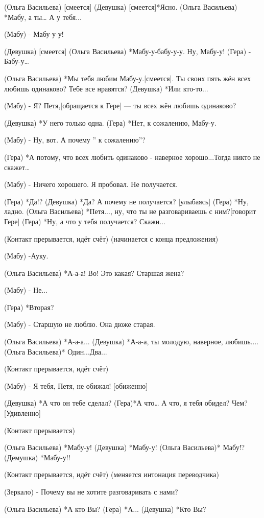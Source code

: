 (Ольга Васильева) [смеется] 
(Девушка) [смеется]*Ясно.
(Ольга Васильева) *Мабу, а ты… А у тебя...

(Мабу) -  Мабу-у-у!

(Девушка) [смеется] 
(Ольга Васильева) *Мабу-у-бабу-у-у. Ну, Мабу-у!
(Гера) - Бабу-у…

(Ольга Васильева) *Мы тебя любим Мабу-у.[смеется]. Ты своих пять жён всех любишь одинаково? Тебе все нравятся? 
(Девушка) *Или кто-то...

(Мабу) - Я? Петя,[обращается к Гере] — ты всех жён любишь одинаково?

(Девушка) *У него только одна.
(Гера) *Нет, к сожалению, Мабу-у. 

(Мабу)  - Ну, вот. А почему ” к сожалению”?

(Гера) *А потому, что всех любить одинаково - наверное хорошо...Тогда никто не скажет…

(Мабу) - Ничего хорошего. Я пробовал.  Не получается.

(Гера) *Да!?
(Девушка) *Да? А почему не получается? [улыбаясь]
(Гера) *Ну, ладно.
(Ольга Васильева) *Петя..., ну, что ты не разговариваешь с ним?[говорит Гере]
(Гера) *Ну, а что у тебя получается? Скажи...

(Контакт прерывается, идёт счёт)
(начинается с конца предложения)

(Мабу) -Ауку.

(Ольга Васильева) *А-а-а! Во! Это какая? Старшая жена?

(Мабу) - Не...

(Гера) *Вторая?

 (Мабу) - Старшую не люблю. Она  дюже старая.

(Ольга Васильева) *А-а-а...
(Девушка) *А-а-а, ты молодую, наверное, любишь....
(Ольга Васильева)* Один...Два...

(Контакт прерывается, идёт счёт)


 (Мабу) - Я тебя, Петя, не обижал! [обиженно]

(Девушка) *А что он тебе сделал?
(Гера)*А что… А что, я тебя обидел? Чем? [Удивленно]

(Контакт прерывается)

(Ольга Васильева) *Мабу-у!
(Девушка) *Мабу-у!
(Ольга Васильева)* Мабу!?
(Демушка) *Мабу-у!!

(Контакт прерывается, идёт счёт)
(меняется интонация переводчика)

(Зеркало) - Почему вы не хотите разговаривать с нами?

(Ольга Васильева) *А кто Вы?
(Гера) *А...
(Девушка) *Кто Вы?

